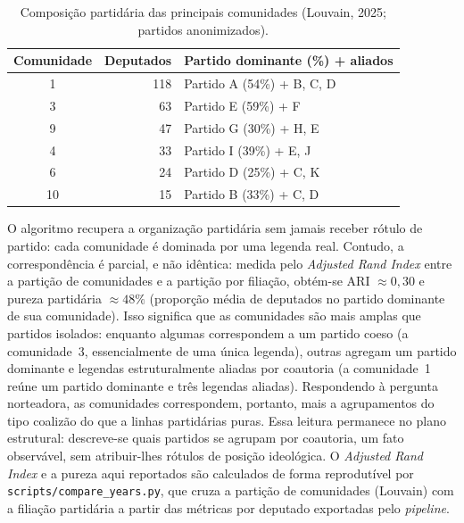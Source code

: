 \documentclass[
      12pt,
      a4paper,
      openright,
      oneside,
      chapter=TITLE,
      section=TITLE,
      english,
      french,
      spanish,
      brazilian
    ]{abntex2}
\begin{document}
    \begin{table}[H]
    \centering
    \caption{Composição partidária das principais comunidades (Louvain, 2025; partidos anonimizados).}
    \label{tab:comunidade_partido}
    \begin{tabular}{crl}
    \toprule
    \textbf{Comunidade} & \textbf{Deputados} & \textbf{Partido dominante (\%) + aliados} \\
    \midrule
    1 & 118 & Partido A (54\%) + B, C, D \\
    3 & 63  & Partido E (59\%) + F \\
    9 & 47  & Partido G (30\%) + H, E \\
    4 & 33  & Partido I (39\%) + E, J \\
    6 & 24  & Partido D (25\%) + C, K \\
    10 & 15 & Partido B (33\%) + C, D \\
    \bottomrule
    \end{tabular}
    \end{table}
    
    
    
    O algoritmo recupera a organização partidária sem jamais receber rótulo de partido: cada comunidade é dominada por uma legenda real. Contudo, a correspondência é parcial, e não idêntica: medida pelo \textit{Adjusted Rand Index} entre a partição de comunidades e a partição por filiação, obtém-se ARI $\approx 0{,}30$ e pureza partidária $\approx 48\%$ (proporção média de deputados no partido dominante de sua comunidade). Isso significa que as comunidades são mais amplas que partidos isolados: enquanto algumas correspondem a um partido coeso (a comunidade~3, essencialmente de uma única legenda), outras agregam um partido dominante e legendas estruturalmente aliadas por coautoria (a comunidade~1 reúne um partido dominante e três legendas aliadas). Respondendo à pergunta norteadora, as comunidades correspondem, portanto, mais a agrupamentos do tipo coalizão do que a linhas partidárias puras. Essa leitura permanece no plano estrutural: descreve-se quais partidos se agrupam por coautoria, um fato observável, sem atribuir-lhes rótulos de posição ideológica. O \textit{Adjusted Rand Index} e a pureza aqui reportados são calculados de forma reprodutível por \texttt{scripts/compare\_years.py}, que cruza a partição de comunidades (Louvain) com a filiação partidária a partir das métricas por deputado exportadas pelo \textit{pipeline}.
    
\end{document}
